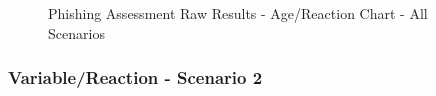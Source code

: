 \documentclass[a4paper]{article}
\begin{document}
\vspace{5mm}

\begin{figure}[H]
	\centering
	\caption{Phishing Assessment Raw Results - Age/Reaction Chart - All Scenarios}
	\label{chart-age-alls}
\end{figure}

\newpage

\subsubsection*{Variable/Reaction - Scenario 2}
\end{document}
